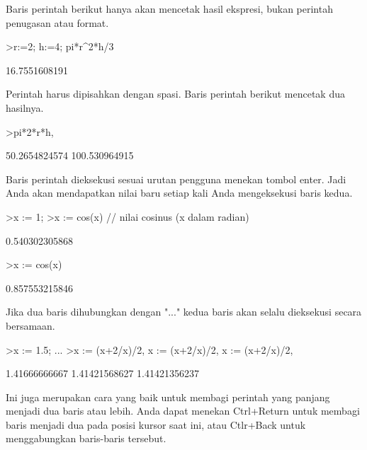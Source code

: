 \documentclass[a4paper,10pt]{article}
\begin{document}
\begin{eulernotebook}
\begin{eulercomment}
\begin{eulercomment}
\begin{eulercomment}
Baris perintah berikut hanya akan mencetak hasil ekspresi, bukan
perintah penugasan atau format.
\end{eulercomment}
\begin{eulerprompt}
>r:=2; h:=4; pi*r^2*h/3
\end{eulerprompt}
\begin{euleroutput}
  16.7551608191
\end{euleroutput}
\begin{eulercomment}
Perintah harus dipisahkan dengan spasi. Baris perintah berikut
mencetak dua hasilnya.
\end{eulercomment}
\begin{eulerprompt}
>pi*2*r*h, %
\end{eulerprompt}
\begin{euleroutput}
  50.2654824574
  100.530964915
\end{euleroutput}
\begin{eulercomment}
Baris perintah dieksekusi sesuai urutan pengguna menekan tombol enter.
Jadi Anda akan mendapatkan nilai baru setiap kali Anda mengeksekusi
baris kedua.
\end{eulercomment}
\begin{eulerprompt}
>x := 1;
>x := cos(x) // nilai cosinus (x dalam radian)
\end{eulerprompt}
\begin{euleroutput}
  0.540302305868
\end{euleroutput}
\begin{eulerprompt}
>x := cos(x)
\end{eulerprompt}
\begin{euleroutput}
  0.857553215846
\end{euleroutput}
\begin{eulercomment}
Jika dua baris dihubungkan dengan "..." kedua baris akan selalu
dieksekusi secara bersamaan.
\end{eulercomment}
\begin{eulerprompt}
>x := 1.5; ...
>x := (x+2/x)/2, x := (x+2/x)/2, x := (x+2/x)/2, 
\end{eulerprompt}
\begin{euleroutput}
  1.41666666667
  1.41421568627
  1.41421356237
\end{euleroutput}
\begin{eulercomment}
Ini juga merupakan cara yang baik untuk membagi perintah yang panjang
menjadi dua baris atau lebih. Anda dapat menekan Ctrl+Return untuk
membagi baris menjadi dua pada posisi kursor saat ini, atau Ctlr+Back
untuk menggabungkan baris-baris tersebut.


\end{eulercomment}
\end{eulercomment}
\end{eulercomment}
\end{eulernotebook}
\end{document}
